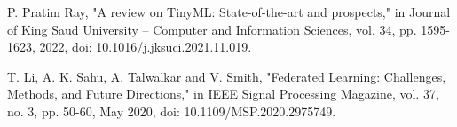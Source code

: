 \documentclass[conference]{IEEEtran}
\begin{document}
\begin{thebibliography}{00}
 P. Pratim Ray, "A review on TinyML: State-of-the-art and prospects," in Journal of King Saud University –
Computer and Information Sciences, vol. 34, pp. 1595-1623, 2022, doi: 10.1016/j.jksuci.2021.11.019.

 T. Li, A. K. Sahu, A. Talwalkar and V. Smith, "Federated Learning: Challenges, Methods, and Future Directions," in IEEE Signal Processing Magazine, vol. 37, no. 3, pp. 50-60, May 2020, doi: 10.1109/MSP.2020.2975749.
\end{thebibliography}
\vspace{12pt}
\end{document}
